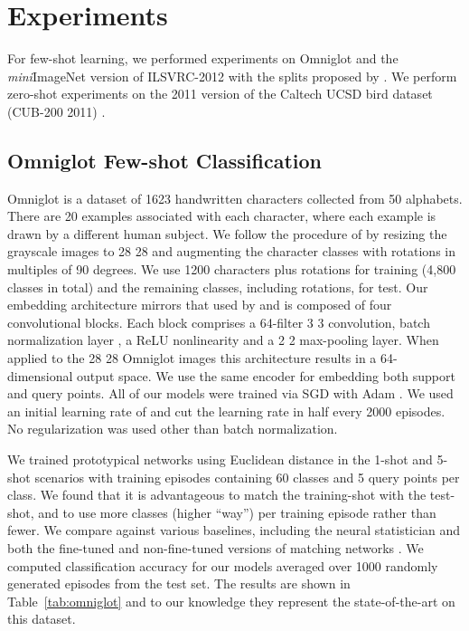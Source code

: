 \documentclass{article}
\begin{document}
\section{Experiments}

For few-shot learning, we performed experiments on Omniglot \citep{lake2011one} and the \emph{mini}ImageNet version of ILSVRC-2012 \citep{russakovsky2015imagenet} with the splits proposed by \citet{ravi2017meta}.  We perform zero-shot experiments on the 2011 version of the Caltech UCSD bird dataset (CUB-200 2011) \citep{welinder2010caltech}.

\subsection{Omniglot Few-shot Classification}
Omniglot \citep{lake2011one} is a dataset of 1623 handwritten characters collected from 50 alphabets. There are 20 examples associated with each character, where each example is drawn by a different human subject. We follow the procedure of \citet{vinyals2016matching} by resizing the grayscale images to 28  28 and augmenting the character classes with rotations in multiples of 90 degrees. We use 1200 characters plus rotations for training (4,800 classes in total) and the remaining classes, including rotations, for test. Our embedding architecture mirrors that used by \citet{vinyals2016matching} and is composed of four convolutional blocks. Each block comprises a 64-filter 3  3 convolution, batch normalization layer \citep{ioffe2015batch}, a ReLU nonlinearity and a 2  2 max-pooling layer. When applied to the 28  28 Omniglot images this architecture results in a 64-dimensional output space. We use the same encoder for embedding both support and query points. All of our models were trained via SGD with Adam \citep{kingma2014adam}. We used an initial learning rate of  and cut the learning rate in half every 2000 episodes. No regularization was used other than batch normalization.

We trained prototypical networks using Euclidean distance in the 1-shot and 5-shot scenarios with training episodes containing 60 classes and 5 query points per class. We found that it is advantageous to match the training-shot with the test-shot, and to use more classes (higher ``way'') per training episode rather than fewer. We compare against various baselines, including the neural statistician \citep{edwards2017towards} and both the fine-tuned and non-fine-tuned versions of matching networks \citep{vinyals2016matching}. We computed classification accuracy for our models averaged over 1000 randomly generated episodes from the test set. The results are shown in Table~\ref{tab:omniglot} and to our knowledge they represent the state-of-the-art on this dataset.
\end{document}
